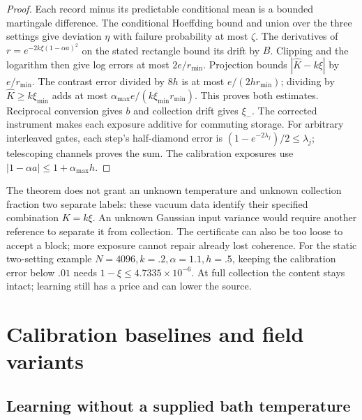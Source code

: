 \documentclass[11pt]{article}
\theoremstyle{definition}
\theoremstyle{remark}
\begin{document}
\begin{proof}
Each record minus its predictable conditional mean is a bounded martingale
difference. The conditional Hoeffding bound and union over the three settings
give deviation $\eta$ with failure probability at most $\zeta$.
The derivatives of $r=e^{-2k\xi(1-\alpha a)^2}$ on the stated rectangle bound
its drift by $B$. Clipping and the logarithm then give log errors at most
$2e/r_{\min}$. Projection bounds $|\widehat K-k\xi|$ by $e/r_{\min}$.
The contrast error divided by $8h$ is at most $e/(2hr_{\min})$;
dividing by $\widehat K\ge k\xi_{\min}$ adds at most
$\alpha_{\max}e/(k\xi_{\min}r_{\min})$. This proves both estimates.
Reciprocal conversion gives $b$ and collection drift gives $\xi_-$.
The corrected instrument makes each exposure additive for commuting storage.
For arbitrary interleaved gates, each step's half-diamond error is
$(1-e^{-2\lambda_j})/2\le\lambda_j$; telescoping channels proves the sum.
The calibration exposures use $|1-\alpha a|\le1+\alpha_{\max}h$.
\end{proof}

The theorem does not grant an unknown temperature and unknown collection fraction
two separate labels: these vacuum data identify their specified combination
$K=k\xi$. An unknown Gaussian input variance would require another reference
to separate it from collection. The certificate can also be too loose to accept
a block; more exposure cannot repair already lost coherence. For the static
two-setting example $N=4096,k=.2,\alpha=1.1,h=.5$, keeping the calibration
error below $.01$ needs $1-\xi\le4.7335\times10^{-6}$. At full collection
the content stays intact; learning still has a price and can lower the source.

\section{Calibration baselines and field variants}
\label{app:quantum-baselines}

\subsection{Learning without a supplied bath temperature}
\label{subsec:unknown_bath}
\end{document}
